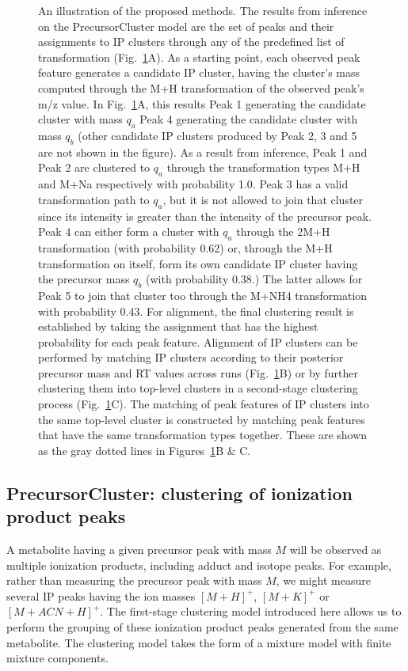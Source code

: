 \begin{figure}[!htbp]
\caption{\label{fig:01} An illustration of the proposed methods. The results from inference on the PrecursorCluster model are the set of peaks and their assignments to IP clusters through any of the predefined list of transformation (Fig.~\ref{fig:01}A). As a starting point, each observed peak feature generates a candidate IP cluster, having the cluster's mass computed through the M+H transformation of the observed peak's m/z value. In Fig.~\ref{fig:01}A, this results Peak 1 generating the candidate cluster with mass $q_a$ Peak 4 generating the candidate cluster with mass $q_b$ (other candidate IP clusters produced by Peak 2, 3 and 5 are not shown in the figure). As a result from inference, Peak 1 and Peak 2 are clustered to $q_a$ through the transformation types M+H and M+Na respectively with probability 1.0. Peak 3 has a valid transformation path to $q_a$, but it is not allowed to join that cluster since its intensity is greater than the intensity of the precursor peak. Peak 4 can either form a cluster with $q_a$ through the 2M+H transformation (with probability 0.62) or, through the M+H transformation on itself, form its own candidate IP cluster having the precursor mass $q_b$ (with probability 0.38.) The latter allows for Peak 5 to join that cluster too through the M+NH4 transformation with probability 0.43. For alignment, the final clustering result is established by taking the assignment that has the highest probability for each peak feature. Alignment of IP clusters can be performed by matching IP clusters according to their posterior precursor mass and RT values across runs (Fig.~\ref{fig:01}B) or by further clustering them into top-level clusters in a second-stage clustering process (Fig.~\ref{fig:01}C). The matching of peak features of IP clusters into the same top-level cluster is constructed by matching peak features that have the same transformation types together. These are shown as the gray dotted lines in Figures~\ref{fig:01}B \& C.}
\end{figure}

\subsection{PrecursorCluster: clustering of ionization product peaks\label{sub:ip-clustering}}

A metabolite having a given precursor peak with mass $M$ will be observed as multiple ionization products, including adduct and isotope peaks. For example, rather than measuring the precursor peak with mass $M$, we might measure several IP peaks having the ion masses $[M+H]^+$, $[M+K]^+$ or $[M+ACN+H]^+$. The first-stage clustering model introduced here allows us to perform the grouping of these ionization product peaks generated from the same metabolite. The clustering model takes the form of a mixture model with finite mixture components. 

